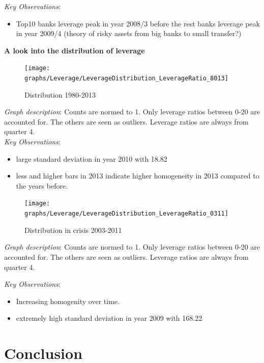 \documentclass[12pt, a4paper]{article} %
\begin{document}
\noindent \textit{Key Observations}:
\begin{itemize}
\item Top10 banks leverage peak in year 2008/3 before the rest banks leverage peak in year 2009/4 (theory of risky assets from big banks to small transfer?) 
\end{itemize}

\pagebreak

\textbf{A look into the distribution of leverage}\\



\begin{figure}[hbtp]
\centering
\caption{Distribution 1980-2013}
\texttt{[image: graphs/Leverage/LeverageDistribution\_LeverageRatio\_8013]}
\end{figure}

\noindent \textit{Graph description}: Counts are normed to 1. Only leverage ratios between 0-20 are accounted for. The others are seen as outliers. Leverage ratios are always from quarter 4.
\\

\noindent \textit{Key Observations}:
\begin{itemize}
\item large standard deviation in year 2010 with 18.82
\item less and higher bars in 2013 indicate higher homogeneity in 2013 compared to the years before.
\end{itemize}

\pagebreak


\begin{figure}[hbtp]
\centering
\caption{Distribution in crisis 2003-2011}
\texttt{[image: graphs/Leverage/LeverageDistribution\_LeverageRatio\_0311]}
\end{figure}

\noindent \textit{Graph description}: Counts are normed to 1. Only leverage ratios between 0-20 are accounted for. The others are seen as outliers. Leverage ratios are always from quarter 4.

\noindent \textit{Key Observations}:
\begin{itemize}
\item Increasing homogenity over time.
\item extremely high standard deviation in year 2009 with 168.22
\end{itemize}


\section{Conclusion}
\end{document}
